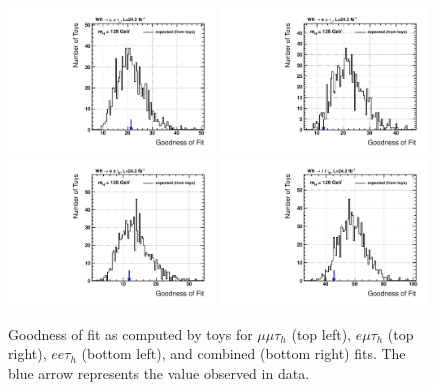 \begin{figure}
\begin{center}
  \includegraphics[width=0.49\textwidth]{4_Analisys/pics/GoF/mmt-goodness-of-fit-125.pdf}
  \includegraphics[width=0.49\textwidth]{4_Analisys/pics/GoF/emt-goodness-of-fit-125.pdf}\\
  \includegraphics[width=0.49\textwidth]{4_Analisys/pics/GoF/eet-goodness-of-fit-125.pdf}
  \includegraphics[width=0.49\textwidth]{4_Analisys/pics/GoF/vhtt_wh-goodness-of-fit-125.pdf}\\
  \caption{Goodness of fit as computed by toys for $\mu\mu\tau_h$ (top left), $e\mu\tau_h$ (top right), $ee\tau_h$ (bottom left), and combined (bottom right) fits. The blue arrow represents the value observed in data.}
  \label{fig:gof}
\end{center}
\end{figure}



